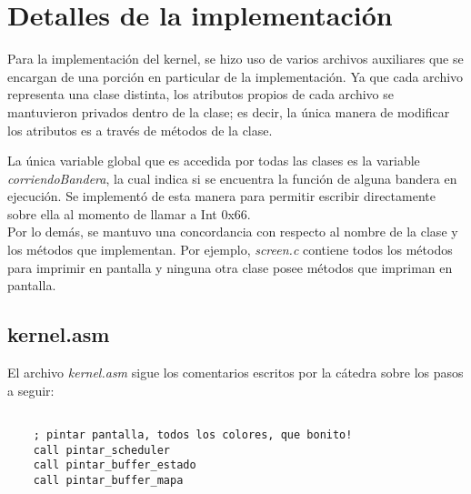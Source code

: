 \documentclass[a4paper]{article}
\newenvironment{codesnippet}{%
	\begin{Sbox}\begin{minipage}{\textwidth}\sffamily\small}%
	{\end{minipage}\end{Sbox}%
		\begin{center}%
		\vspace{-0.4cm}\colorbox{litegrey}{\TheSbox}\end{center}\vspace{0.3cm}}
\begin{document}
\thispagestyle{empty}

\maketitle
\newpage

\thispagestyle{empty}
\vfill

\thispagestyle{empty}
\vspace{3cm}
\newpage


\newpage

\section{Detalles de la implementación}

Para la implementación del kernel, se hizo uso de varios archivos auxiliares que se encargan de una porción en particular de la implementación. Ya que cada archivo representa una clase distinta, los atributos propios de cada archivo se mantuvieron privados dentro de la clase; es decir, la única manera de modificar los atributos es a través de métodos de la clase.

La única variable global que es accedida por todas las clases es la variable \textit{corriendoBandera}, la cual indica si se encuentra la función de alguna bandera en ejecución. Se implementó de esta manera para permitir escribir directamente sobre ella al momento de llamar a Int 0x66.
\\
Por lo demás, se mantuvo una concordancia con respecto al nombre de la clase y los métodos que implementan. Por ejemplo, \textit{screen.c} contiene todos los métodos para imprimir en pantalla y ninguna otra clase posee métodos que impriman en pantalla.


\subsection{kernel.asm}
El archivo \textit{kernel.asm} sigue los comentarios escritos por la cátedra sobre los pasos a seguir:

\begin{codesnippet}
\begin{verbatim}

    ; pintar pantalla, todos los colores, que bonito!
    call pintar_scheduler
    call pintar_buffer_estado
    call pintar_buffer_mapa

\end{verbatim}
\end{codesnippet}
\end{document}
